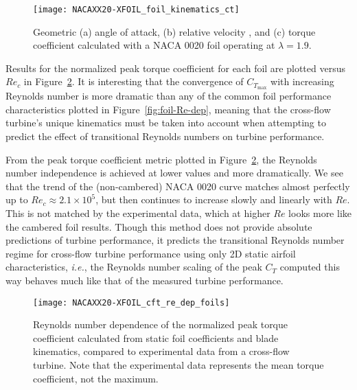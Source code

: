 \begin{figure}
    \centering
    
    \texttt{[image: NACAXX20-XFOIL\_foil\_kinematics\_ct]}
    
    \caption{Geometric (a) angle of attack, (b) relative velocity , and (c)
        torque coefficient calculated with a NACA 0020 foil operating at
        $\lambda=1.9$.}
    
    \label{fig:blade-kinematics}
\end{figure}

Results for the normalized peak torque coefficient for each foil are plotted
versus $Re_c$ in Figure~\ref{fig:foils-C_T-Re-dep}. It is interesting
that the convergence of $C_{T_\mathrm{max}}$ with increasing Reynolds number is
more dramatic than any of the common foil performance characteristics plotted in
Figure~\ref{fig:foil-Re-dep}, meaning that the cross-flow turbine's unique
kinematics must be taken into account when attempting to predict the effect of
transitional Reynolds numbers on turbine performance.

From the peak torque coefficient metric plotted in
Figure~\ref{fig:foils-C_T-Re-dep}, the Reynolds number independence is achieved
at lower values and more dramatically. We see that the trend of the
(non-cambered) NACA 0020 curve matches almost perfectly up to $Re_c \approx 2.1
\times 10^5$, but then continues to increase slowly and linearly with $Re$. This
is not matched by the experimental data, which at higher $Re$ looks more like
the cambered foil results. Though this method does not provide absolute
predictions of turbine performance, it predicts the transitional Reynolds number
regime for cross-flow turbine performance using only 2D static airfoil
characteristics, \emph{i.e.}, the Reynolds number scaling of the peak $C_T$
computed this way behaves much like that of the measured turbine performance.

\begin{figure}
    \centering
    
    \texttt{[image: NACAXX20-XFOIL\_cft\_re\_dep\_foils]}
    
    \caption{Reynolds number dependence of the normalized peak torque
        coefficient calculated from static foil coefficients and blade kinematics,
        compared to experimental data from a cross-flow turbine. Note that the
        experimental data represents the mean torque coefficient, not the maximum.}
    
    \label{fig:foils-C_T-Re-dep}
\end{figure}


